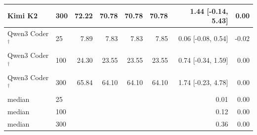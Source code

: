 \begin{table}[t]
\begin{tabular}{llrrrrrr}
Kimi K2 & 300 & 72.22 & 70.78 & 70.78 & 70.78 & 1.44 [-0.14, 5.43] & 0.00 \\
\midrule
Qwen3 Coder$^\dagger$ & 25 & 7.89 & 7.83 & 7.83 & 7.85 & 0.06 [-0.08, 0.54] & -0.02 \\
Qwen3 Coder$^\dagger$ & 100 & 24.30 & 23.55 & 23.55 & 23.55 & 0.74 [-0.34, 1.59] & 0.00 \\
Qwen3 Coder$^\dagger$ & 300 & 65.84 & 64.10 & 64.10 & 64.10 & 1.74 [-0.23, 4.78] & 0.00 \\
\midrule
median & 25 &  &  &  &  & 0.01 & 0.00 \\
median & 100 &  &  &  &  & 0.12 & 0.00 \\
median & 300 &  &  &  &  & 0.36 & 0.00 \\
\bottomrule
\end{tabular}
\end{table}
